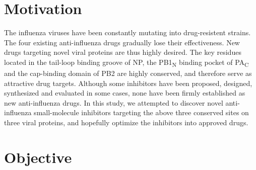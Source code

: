 
\section{Motivation}

The influenza viruses have been constantly mutating into drug-resistent strains. The four existing anti-influenza drugs gradually lose their effectiveness. New drugs targeting novel viral proteins are thus highly desired. The key residues located in the tail-loop binding groove of NP, the PB1\textsubscript{N} binding pocket of PA\textsubscript{C} and the cap-binding domain of PB2 are highly conserved, and therefore serve as attractive drug targets. Although some inhibitors have been proposed, designed, synthesized and evaluated in some cases, none have been firmly established as new anti-influenza drugs. In this study, we attempted to discover novel anti-influenza small-molecule inhibitors targeting the above three conserved sites on three viral proteins, and hopefully optimize the inhibitors into approved drugs.

\section{Objective}

